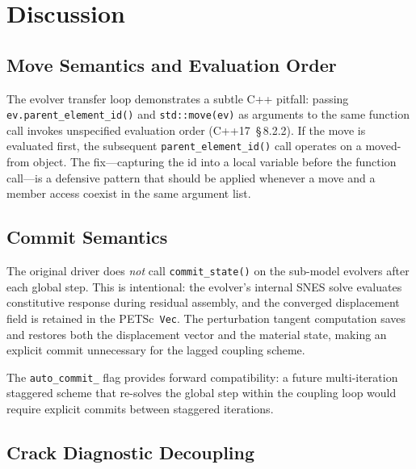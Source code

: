 \section{Discussion}
\label{sec:driver-discussion}

\subsection{Move Semantics and Evaluation Order}

The evolver transfer loop demonstrates a subtle C++ pitfall: passing
\texttt{ev.parent\_element\_id()} and \texttt{std::move(ev)} as
arguments to the same function call invokes unspecified evaluation
order (C++17~\S\,8.2.2).  If the move is evaluated first, the
subsequent \texttt{parent\_element\_id()} call operates on a
moved-from object.  The fix---capturing the id into a local variable
before the function call---is a defensive pattern that should be
applied whenever a move and a member access coexist in the same
argument list.

\subsection{Commit Semantics}

The original driver does \emph{not} call
\texttt{commit\_state()} on the sub-model evolvers after each global
step.  This is intentional: the evolver's internal SNES solve
evaluates constitutive response during residual assembly, and the
converged displacement field is retained in the PETSc~\texttt{Vec}.
The perturbation tangent computation saves and restores both the
displacement vector and the material state, making an explicit commit
unnecessary for the lagged coupling scheme.

The \texttt{auto\_commit\_} flag provides forward compatibility: a
future multi-iteration staggered scheme that re-solves the global
step within the coupling loop would require explicit commits between
staggered iterations.

\subsection{Crack Diagnostic Decoupling}

